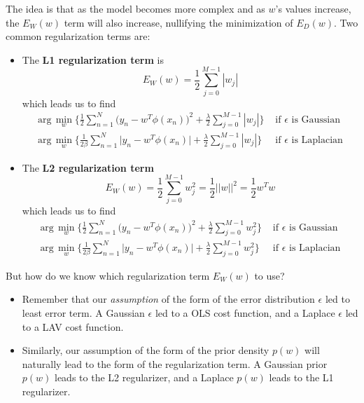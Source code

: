 \documentclass{article}
\begin{document}
    The idea is that as the model becomes more complex and as $w$'s values increase, the $E_W (w)$ term will also increase, nullifying the minimization of $E_D (w)$. Two common regularization terms are:
    \begin{itemize}
      \item The \textbf{L1 regularization term} is
      \begin{equation}
        E_W (w) = \frac{1}{2} \sum_{j=0}^{M-1} |w_j|
      \end{equation}
      which leads us to find
      \begin{align*}
        \text{arg}\, \min_w \bigg\{ \frac{1}{2} \sum_{n=1}^N \big( y_n - w^T \phi(x_n) \big)^2  + \frac{\lambda}{2} \sum_{j=0}^{M-1} |w_j| \bigg\} & \text{ if } \epsilon \text{ is Gaussian} \\
        \text{arg}\, \min_w \bigg\{ \frac{1}{2 \beta} \sum_{n=1}^N \big| y_n - w^T \phi(x_n) \big| + \frac{\lambda}{2} \sum_{j=0}^{M-1} |w_j| \bigg\} & \text{ if } \epsilon \text{ is Laplacian}
      \end{align*}

      \item The \textbf{L2 regularization term}
      \begin{equation}
        E_W (w) = \frac{1}{2} \sum_{j=0}^{M-1} w_j^2 = \frac{1}{2} ||w||^2 = \frac{1}{2} w^T w
      \end{equation}
      which leads us to find
      \begin{align*}
        \text{arg}\, \min_w \bigg\{ \frac{1}{2} \sum_{n=1}^N \big( y_n - w^T \phi(x_n) \big)^2  + \frac{\lambda}{2} \sum_{j=0}^{M-1} w_j^2 \bigg\} & \text{ if } \epsilon \text{ is Gaussian} \\
        \text{arg}\, \min_w \bigg\{ \frac{1}{2 \beta} \sum_{n=1}^N \big| y_n - w^T \phi(x_n) \big| + \frac{\lambda}{2} \sum_{j=0}^{M-1} w_j^2 \bigg\} & \text{ if } \epsilon \text{ is Laplacian}
      \end{align*}
    \end{itemize}

    But how do we know which regularization term $E_W (w)$ to use?
    \begin{itemize}
      \item Remember that our \textit{assumption} of the form of the error distribution $\epsilon$ led to least error term. A Gaussian $\epsilon$ led to a OLS cost function, and a Laplace $\epsilon$ led to a LAV cost function.
      \item Similarly, our assumption of the form of the prior density $p(w)$ will naturally lead to the form of the regularization term. A Gaussian prior $p(w)$ leads to the L2 regularizer, and a Laplace $p(w)$ leads to the L1 regularizer.
    \end{itemize}
\end{document}
